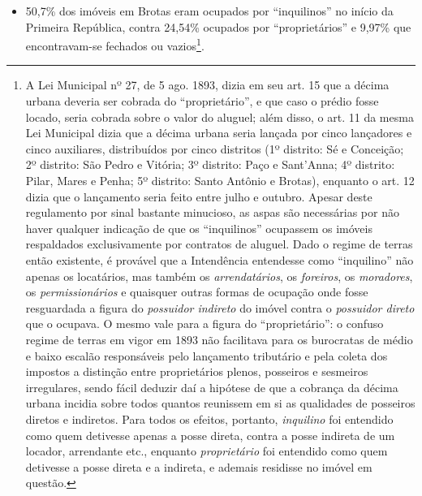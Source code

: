 \begin{itemize}
\item 50,7\% dos imóveis em Brotas eram ocupados por ``inquilinos'' no início da Primeira República, contra 24,54\% ocupados por ``proprietários'' e 9,97\% que encontravam-se fechados ou vazios\footnote{A Lei Municipal nº 27, de 5 ago. 1893, dizia em seu art. 15 que a décima urbana deveria ser cobrada do ``proprietário'', e que caso o prédio fosse locado, seria cobrada sobre o valor do aluguel; além disso, o art. 11 da mesma Lei Municipal dizia que a décima urbana seria lançada por cinco lançadores e cinco auxiliares, distribuídos por cinco distritos (1º distrito: Sé e Conceição; 2º distrito: São Pedro e Vitória; 3º distrito: Paço e Sant'Anna; 4º distrito: Pilar, Mares e Penha;  5º distrito: Santo Antônio e Brotas), enquanto o art. 12 dizia que o lançamento seria feito entre julho e outubro. Apesar deste regulamento por sinal bastante minucioso, as aspas são necessárias por não haver qualquer indicação de que os ``inquilinos'' ocupassem os imóveis respaldados exclusivamente por contratos de aluguel. Dado o regime de terras então existente, é provável que a Intendência entendesse como ``inquilino'' não apenas os locatários, mas também os \textit{arrendatários}, os \textit{foreiros}, os \textit{moradores}, os \textit{permissionários} e quaisquer outras formas de ocupação onde fosse resguardada a figura do \textit{possuidor indireto} do imóvel contra o \textit{possuidor direto} que o ocupava. O mesmo vale para a figura do ``proprietário'': o confuso regime de terras em vigor em 1893 não facilitava para os burocratas de médio e baixo escalão responsáveis pelo lançamento tributário e pela coleta dos impostos a distinção entre proprietários plenos, posseiros e sesmeiros irregulares, sendo fácil deduzir daí a hipótese de que a cobrança da décima urbana incidia sobre todos quantos reunissem em si as qualidades de posseiros diretos e indiretos. Para todos os efeitos, portanto, \textit{inquilino} foi entendido como quem detivesse apenas a posse direta, contra a posse indireta de um locador, arrendante etc., enquanto \textit{proprietário} foi entendido como quem detivesse a posse direta e a indireta, e ademais residisse no imóvel em questão.}.

\end{itemize}
